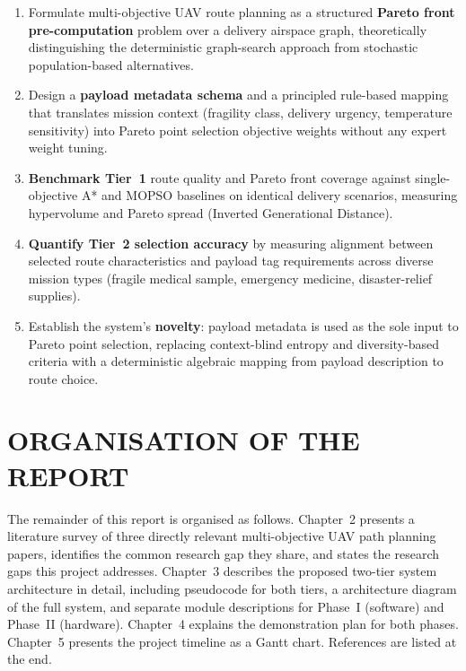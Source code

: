 \begin{enumerate}
  \item Formulate multi-objective UAV route planning as a structured \textbf{Pareto front
        pre-computation} problem over a delivery airspace graph, theoretically
        distinguishing the deterministic graph-search approach from stochastic
        population-based alternatives.

  \item Design a \textbf{payload metadata schema} and a principled rule-based mapping
        that translates mission context (fragility class, delivery urgency, temperature
        sensitivity) into Pareto point selection objective weights without any expert
        weight tuning.

  \item \textbf{Benchmark Tier~1} route quality and Pareto front coverage against
        single-objective A* and MOPSO baselines on identical delivery scenarios,
        measuring hypervolume and Pareto spread (Inverted Generational Distance).

  \item \textbf{Quantify Tier~2 selection accuracy} by measuring alignment between
        selected route characteristics and payload tag requirements across diverse
        mission types (fragile medical sample, emergency medicine, disaster-relief
        supplies).

  \item Establish the system's \textbf{novelty}: payload metadata is used as the sole
        input to Pareto point selection, replacing context-blind entropy and
        diversity-based criteria with a deterministic algebraic mapping from payload
        description to route choice.
\end{enumerate}

\section{ORGANISATION OF THE REPORT}

The remainder of this report is organised as follows. Chapter~2 presents a literature
survey of three directly relevant multi-objective UAV path planning papers, identifies
the common research gap they share, and states the research gaps this project addresses.
Chapter~3 describes the proposed two-tier system architecture in detail, including
pseudocode for both tiers, a architecture diagram of the full system, and separate
module descriptions for Phase~I (software) and Phase~II (hardware). Chapter~4 explains
the demonstration plan for both phases. Chapter~5 presents the project timeline as a
Gantt chart. References are listed at the end.